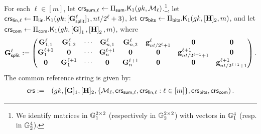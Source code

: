 \begin{description}
For each $\ell\in[m]$, let
\(\mathsf{crs}_{\mathsf{sum},\ell} \gets \Pi_{\mathsf{sum}}.\mathsf{K}_1({gk}, \mathcal{M}_\ell)\).\footnote{We identify
matrices in \(\mathbb{G}_1^{2 \times 2}\) (respectively in \(\mathbb{G}_2^{2 \times 2}\)) with vectors in \(\mathbb{G}_1^{4}\) (resp. in \(\mathbb{G}_2^{4}\)).}, let \(\mathsf{crs}_{\mathsf{lin},\ell}\gets \Pi_\mathsf{lin}.\mathsf{K}_1(gk;\allowbreak[\mathbf{{G}}^\ell_{\mathsf{split}}]_1,nt /2^{\ell}+3)\), let \(\mathsf{crs}_{\mathsf{bits}}\gets\Pi_{\mathsf{bits}}.\mathsf{K}_1(gk,[\mathbf{{H}}]_2,m)\), and let \(\mathsf{crs}_{\mathsf{com}} \gets \Pi_{\mathsf{com}}.\mathsf{K}_1({gk}, \left[\mathbf{{G}}\right]_1,\left[\mathbf{{H}}\right]_2,m)\), where
\[
\mathbf{{G}}_\mathsf{split}^\ell:=
\begin{pmatrix}
\mathbf{{G}}^{\ell}_{1,1} & \mathbf{{G}}^{\ell}_{1,2} & \cdots & \mathbf{{G}}^{\ell}_{n,1} & \mathbf{{G}}^{\ell}_{n,2} & \mathbf{g}^{\ell}_{nt /2^{\ell}+1} & \mathbf{{0}}                       & \mathbf{{0}}\\
\mathbf{{G}}^{\ell+1}_{1} & \mathbf{{0}}           & \cdots & \mathbf{{G}}^{\ell+1}_{n} & \mathbf{{0}}           & \mathbf{{0}}                    &\mathbf{g}^{\ell+1}_{nt /2^{\ell+1}+1} & \mathbf{{0}}\\
\mathbf{{0}}           & \mathbf{{G}}^{\ell+1}_{1} & \cdots & \mathbf{{0}}           & \mathbf{{G}}^{\ell+1}_{n} & \mathbf{{0}}                    & \mathbf{{0}}                       & \mathbf{g}^{\ell+1}_{nt /2^{\ell+1}+1}
\end{pmatrix}.
\]
The common reference string is given by:
\begin{eqnarray*}
\mathsf{crs}&:=&\left( gk, [\mathbf{{G}}]_1,
    [\mathbf{{H}}]_2, \{\mathcal{M}_\ell,\mathsf{crs}_{\mathsf{sum},\ell},\mathsf{crs}_{\mathsf{lin},\ell}:\ell\in [m]\},\mathsf{crs}_{\mathsf{bits}},\mathsf{crs}_{\mathsf{com}} \right).
 \end{eqnarray*}



\end{description}
